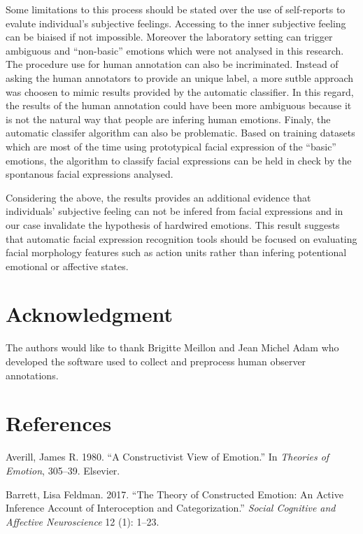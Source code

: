 \documentclass[conference,final,]{IEEEtran}
\begin{document}
Some limitations to this process should be stated over the use of
self-reports to evalute individual's subjective feelings. Accessing to
the inner subjective feeling can be biaised if not impossible. Moreover
the laboratory setting can trigger ambiguous and ``non-basic'' emotions
which were not analysed in this research. The procedure use for human
annotation can also be incriminated. Instead of asking the human
annotators to provide an unique label, a more sutble approach was
choosen to mimic results provided by the automatic classifier. In this
regard, the results of the human annotation could have been more
ambiguous because it is not the natural way that people are infering
human emotions. Finaly, the automatic classifer algorithm can also be
problematic. Based on training datasets which are most of the time using
prototypical facial expression of the ``basic'' emotions, the algorithm
to classify facial expressions can be held in check by the spontanous
facial expressions analysed.

Considering the above, the results provides an additional evidence that
individuals' subjective feeling can not be infered from facial
expressions and in our case invalidate the hypothesis of hardwired
emotions. This result suggests that automatic facial expression
recognition tools should be focused on evaluating facial morphology
features such as action units rather than infering potentional emotional
or affective states.

\hypertarget{acknowledgment}{%
\section{Acknowledgment}\label{acknowledgment}}

The authors would like to thank Brigitte Meillon and Jean Michel Adam
who developed the software used to collect and preprocess human observer
annotations.

\hypertarget{references}{%
\section*{References}\label{references}}

\hypertarget{refs}{}
\leavevmode\hypertarget{ref-averill1980constructivist}{}%
Averill, James R. 1980. ``A Constructivist View of Emotion.'' In
\emph{Theories of Emotion}, 305--39. Elsevier.

\leavevmode\hypertarget{ref-barrett2017theory}{}%
Barrett, Lisa Feldman. 2017. ``The Theory of Constructed Emotion: An
Active Inference Account of Interoception and Categorization.''
\emph{Social Cognitive and Affective Neuroscience} 12 (1): 1--23.
\end{document}
